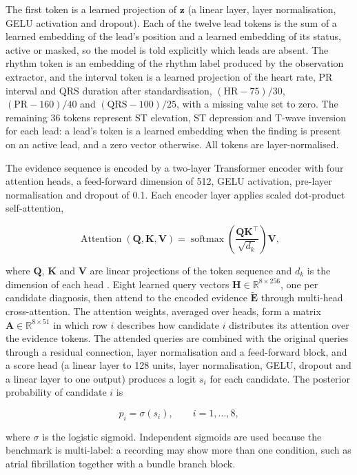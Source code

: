 The first token is a learned projection of $\mathbf{z}$ (a linear layer, layer normalisation, GELU activation and dropout). Each of the twelve lead tokens is the sum of a learned embedding of the lead's position and a learned embedding of its status, active or masked, so the model is told explicitly which leads are absent. The rhythm token is an embedding of the rhythm label produced by the observation extractor, and the interval token is a learned projection of the heart rate, PR interval and QRS duration after standardisation, $(\text{HR}-75)/30$, $(\text{PR}-160)/40$ and $(\text{QRS}-100)/25$, with a missing value set to zero. The remaining 36 tokens represent ST elevation, ST depression and T-wave inversion for each lead: a lead's token is a learned embedding when the finding is present on an active lead, and a zero vector otherwise. All tokens are layer-normalised.

The evidence sequence is encoded by a two-layer Transformer encoder with four attention heads, a feed-forward dimension of 512, GELU activation, pre-layer normalisation and dropout of 0.1. Each encoder layer applies scaled dot-product self-attention,

\[
\operatorname{Attention}(\mathbf{Q},\mathbf{K},\mathbf{V}) = \operatorname{softmax}\!\left(\frac{\mathbf{Q}\mathbf{K}^{\top}}{\sqrt{d_k}}\right)\mathbf{V},
\]

where $\mathbf{Q}$, $\mathbf{K}$ and $\mathbf{V}$ are linear projections of the token sequence and $d_k$ is the dimension of each head \cite{VASWANI2017ATTENTION}. Eight learned query vectors $\mathbf{H} \in \mathbb{R}^{8 \times 256}$, one per candidate diagnosis, then attend to the encoded evidence $\tilde{\mathbf{E}}$ through multi-head cross-attention. The attention weights, averaged over heads, form a matrix $\mathbf{A} \in \mathbb{R}^{8 \times 51}$ in which row $i$ describes how candidate $i$ distributes its attention over the evidence tokens. The attended queries are combined with the original queries through a residual connection, layer normalisation and a feed-forward block, and a score head (a linear layer to 128 units, layer normalisation, GELU, dropout and a linear layer to one output) produces a logit $s_i$ for each candidate. The posterior probability of candidate $i$ is

\[
p_i = \sigma(s_i), \qquad i = 1, \ldots, 8,
\]

where $\sigma$ is the logistic sigmoid. Independent sigmoids are used because the benchmark is multi-label: a recording may show more than one condition, such as atrial fibrillation together with a bundle branch block.

